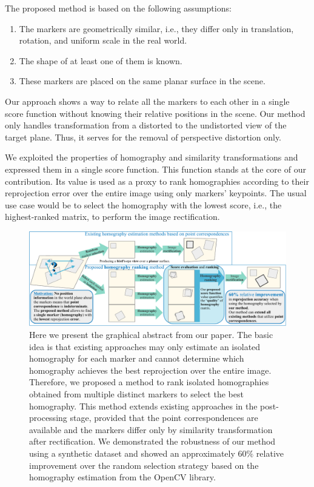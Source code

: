 The proposed method is based on the following assumptions:
\begin{enumerate}
    \item The markers are geometrically similar, i.e., they differ only in translation, rotation, and uniform scale in the real world.
    \item The shape of at least one of them is known.
    \item These markers are placed on the same planar surface in the scene.
\end{enumerate}
Our approach shows a way to relate all the markers to each other in a single score function without knowing their relative positions in the scene. Our method only handles transformation from a distorted to the undistorted view of the target plane. Thus, it serves for the removal of perspective distortion only.

We exploited the properties of homography and similarity transformations and expressed them in a single score function. This function stands at the core of our contribution. Its value is used as a proxy to rank homographies according to their reprojection error over the entire image using only markers' keypoints. The usual use case would be to select the homography with the lowest score, i.e., the highest-ranked matrix, to perform the image rectification.

\begin{figure}[t]
    \centerline{\includegraphics[width=\linewidth]{figures/methodology/graphical_abstract.pdf}}
    \caption[Homography ranking graphical abstract]{Here we present the graphical abstract from our paper. The basic idea is that existing approaches may only estimate an isolated homography for each marker and cannot determine which homography achieves the best reprojection over the entire image. Therefore, we proposed a method to rank isolated homographies obtained from multiple distinct markers to select the best homography. This method extends existing approaches in the post-processing stage, provided that the point correspondences are available and the markers differ only by similarity transformation after rectification. We demonstrated the robustness of our method using a synthetic dataset and showed an approximately $60\%$ relative improvement over the random selection strategy based on the homography estimation from the OpenCV library.}
    \label{fig:GraphicalAbstract}
\end{figure}

